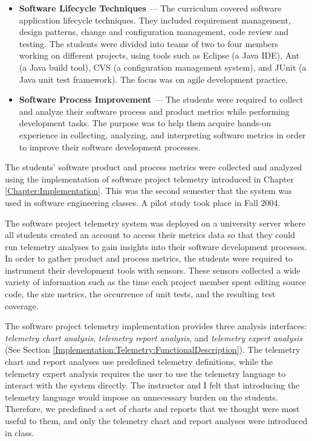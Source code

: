 \begin{itemize}
	\item \textbf{Software Lifecycle Techniques} --- 
The curriculum covered software application lifecycle techniques. They included requirement management, design patterns, change and configuration management, code review and testing. The students were divided into teams of two to four members working on different projects, using tools such as Eclipse (a Java IDE), Ant (a Java build tool), CVS (a configuration management system), and JUnit (a Java unit test framework). The focus was on agile development practice.

	\item \textbf{Software Process Improvement} --- The students were required to collect and analyze their software process and product metrics while performing development tasks. The purpose was to help them acquire hands-on experience in collecting, analyzing, and interpreting software metrics in order to improve their software development processes.
\end{itemize}

The students' software product and process metrics were collected and analyzed using the implementation of software project telemetry introduced in Chapter \ref{Chapter:Implementation}. This was the second semester that the system was used in software engineering classes. A pilot study took place in Fall 2004. 

The software project telemetry system was deployed on a university server where all students created an account to access their metrics data so that they could run telemetry analyses to gain insights into their software development processes. In order to gather product and process metrics, the students were required to instrument their development tools with sensors. These sensors collected a wide variety of information such as the time each project member spent editing source code, the size metrics, the occurrence of unit tests, and the resulting test coverage.

The software project telemetry implementation provides three analysis interfaces: \textit{telemetry chart analysis}, \textit{telemetry report analysis}, and \textit{telemetry expert analysis} (See Section \ref{Implementation:Telemetry:FunctionalDescription}). The telemetry chart and report analyses use predefined telemetry definitions, while the telemetry expert analysis requires the user to use the telemetry language to interact with the system directly. The instructor and I felt that introducing the telemetry language would impose an unnecessary burden on the students. Therefore, we predefined a set of charts and reports that we thought were most useful to them, and only the telemetry chart and report analyses were introduced in class.





